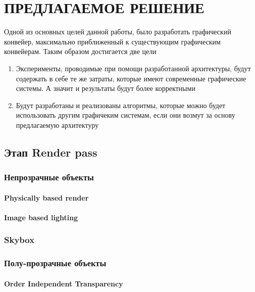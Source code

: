 \chapter{ПРЕДЛАГАЕМОЕ РЕШЕНИЕ} \label{ch3}
Одной из основных целей данной работы, было разработать графический конвейер, максимально приближенный к существующим графическим конвейерам. Таким образом достигается две цели
\begin{enumerate}[1.] 
	\item Эксперименты, проводимые при помощи разработанной архитектуры, будут содержать в себе те же затраты, которые имеют современные графические системы. А значит и результаты будут более корректными
	\item Будут разработаны и реализованы алгоритмы, которые можно будет использовать другим графичеким системам, если они возмут за основу предлагаемую архитектуру
\end{enumerate}



\section{Этап Render pass} \label{ch3:render_pass}
	\subsection{Непрозрачные объекты} \label{ch3:render_pass:opaque}
		\subsubsection{Physically based render} \label{ch3:render_pass:opaque:pbr}
		\subsubsection{Image based lighting} \label{ch3:render_pass:opaque:ibl}
	\subsection{Skybox} \label{ch3:render_pass:skybox}
	\subsection{Полу-прозрачные объекты} \label{ch3:render_pass:transparents}
		\subsubsection{Order Independent Transparency} \label{ch3:render_pass:transparents:oit}
